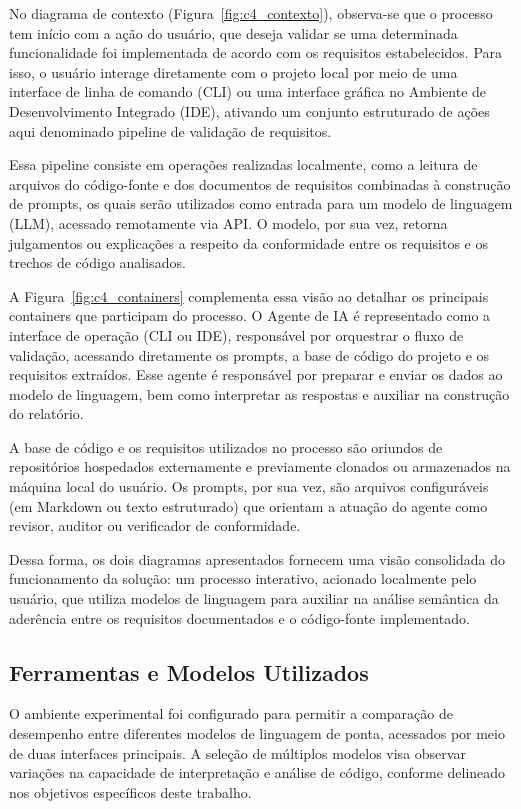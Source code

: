 No diagrama de contexto (Figura~\ref{fig:c4_contexto}), observa-se que o processo tem início com a ação do usuário, que deseja validar se uma determinada funcionalidade foi implementada de acordo com os requisitos estabelecidos. Para isso, o usuário interage diretamente com o projeto local por meio de uma interface de linha de comando (CLI) ou uma interface gráfica no Ambiente de Desenvolvimento Integrado (IDE), ativando um conjunto estruturado de ações aqui denominado pipeline de validação de requisitos.

Essa pipeline consiste em operações realizadas localmente, como a leitura de arquivos do código-fonte e dos documentos de requisitos combinadas à construção de prompts, os quais serão utilizados como entrada para um modelo de linguagem (LLM), acessado remotamente via API. O modelo, por sua vez, retorna julgamentos ou explicações a respeito da conformidade entre os requisitos e os trechos de código analisados.

A Figura~\ref{fig:c4_containers} complementa essa visão ao detalhar os principais containers que participam do processo. O Agente de IA é representado como a interface de operação (CLI ou IDE), responsável por orquestrar o fluxo de validação, acessando diretamente os prompts, a base de código do projeto e os requisitos extraídos. Esse agente é responsável por preparar e enviar os dados ao modelo de linguagem, bem como interpretar as respostas e auxiliar na construção do relatório.

A base de código e os requisitos utilizados no processo são oriundos de repositórios hospedados externamente e previamente clonados ou armazenados na máquina local do usuário. Os prompts, por sua vez, são arquivos configuráveis (em Markdown ou texto estruturado) que orientam a atuação do agente como revisor, auditor ou verificador de conformidade.

Dessa forma, os dois diagramas apresentados fornecem uma visão consolidada do funcionamento da solução: um processo interativo, acionado localmente pelo usuário, que utiliza modelos de linguagem para auxiliar na análise semântica da aderência entre os requisitos documentados e o código-fonte implementado.


\subsection{Ferramentas e Modelos Utilizados}

O ambiente experimental foi configurado para permitir a comparação de desempenho entre diferentes modelos de linguagem de ponta, acessados por meio de duas interfaces principais. A seleção de múltiplos modelos visa observar variações na capacidade de interpretação e análise de código, conforme delineado nos objetivos específicos deste trabalho.

